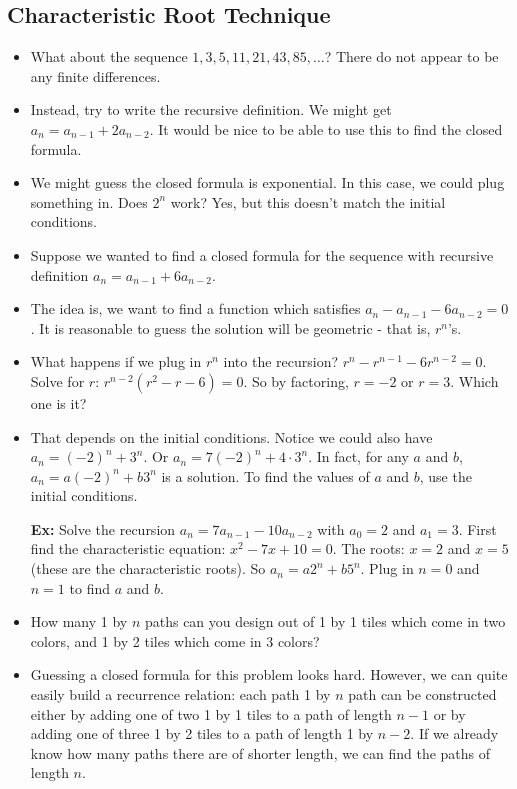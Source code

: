 \documentclass[12pt]{article}
\theoremstyle{plain}
\theoremstyle{definition}
\theoremstyle{remark}
\newcommand{\ex}{\noindent\textbf{Ex:} }
\begin{document}
 \subsection*{Characteristic Root Technique}
 \begin{itemize}
   \item What about the sequence $1, 3, 5, 11, 21, 43, 85, \ldots$?  There do not appear to be any finite differences.

   \item Instead, try to write the recursive definition.  We might get $a_n = a_{n-1} + 2 a_{n-2}$.  It would be nice to be able to use this to find the closed formula.

   \item We might guess the closed formula is exponential.  In this case, we could plug something in.  Does $2^n$ work?  Yes, but this doesn't match the initial conditions.


	\item Suppose we wanted to find a closed formula for the sequence with recursive definition $a_n = a_{n-1} + 6a_{n-2}$.

  \item The idea is, we want to find a function which satisfies $a_n - a_{n-1} - 6a_{n-2} = 0$.  It is reasonable to guess the solution will be geometric - that is, $r^n$'s.

  \item What happens if we plug in $r^n$ into the recursion?   $r^n - r^{n-1} - 6r^{n-2} = 0$.  Solve for $r$: $r^{n-2}(r^2 - r - 6) = 0$.  So by factoring, $r = -2$ or $r = 3$.  Which one is it?

  \item That depends on the initial conditions.  Notice we could also have $a_n = (-2)^n + 3^n$.  Or $a_n = 7(-2)^n + 4\cdot 3^n$.  In fact, for any $a$ and $b$, $a_n = a(-2)^n + b 3^n$ is a solution.  To find the values of $a$ and $b$, use the initial conditions.

  \ex Solve the recursion $a_n = 7a_{n-1} - 10 a_{n-2}$ with $a_0 = 2$ and $a_1 = 3$.  First find the characteristic equation: $x^2 - 7x + 10 = 0$.  The roots: $x = 2$ and $x = 5$ (these are the characteristic roots).  So $a_n = a 2^n + b 5^n$.  Plug in $n = 0$ and $n = 1$ to find $a$ and $b$.


  \item How many 1 by $n$ paths can you design out of 1 by 1 tiles which come in two colors, and 1 by 2 tiles which come in 3 colors?

  \item Guessing a closed formula for this problem looks hard.  However, we can quite easily build a recurrence relation: each path 1 by $n$ path can be constructed either by adding one of two 1 by 1 tiles to a path of length $n-1$ or by adding one of three 1 by 2 tiles to a path of length 1 by $n-2$.  If we already know how many paths there are of shorter length, we can find the paths of length $n$.


\end{itemize}
\end{document}
